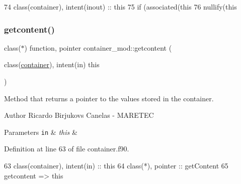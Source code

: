 \begin{DoxyCode}
74     \textcolor{keywordtype}{class}(container), \textcolor{keywordtype}{intent(inout)} :: this    
75     \textcolor{keywordflow}{if} (\textcolor{keyword}{associated}(this%
76     \textcolor{keyword}{nullify}(this%
\end{DoxyCode}
\mbox{\label{namespacecontainer__mod_a23a016e747d896622127c0c21dca9836}} 
\subsubsection{\texorpdfstring{getcontent()}{getcontent()}}
{\footnotesize\ttfamily class($\ast$) function, pointer container\+\_\+mod\+::getcontent (\begin{DoxyParamCaption}\item[{class(\mbox{\hyperlink{structcontainer__mod_1_1container}{container}}), intent(in)}]{this }\end{DoxyParamCaption})\hspace{0.3cm}{\ttfamily [private]}}



Method that returns a pointer to the values stored in the container. 

\begin{DoxyAuthor}{Author}
Ricardo Birjukovs Canelas -\/ M\+A\+R\+E\+T\+EC 
\end{DoxyAuthor}

\begin{DoxyParams}[1]{Parameters}
\mbox{\tt in}  & {\em this} & \\
\hline
\end{DoxyParams}


Definition at line 63 of file container.\+f90.


\begin{DoxyCode}
63     \textcolor{keywordtype}{class}(container), \textcolor{keywordtype}{intent(in)} :: this
64     \textcolor{keywordtype}{class}(*), \textcolor{keywordtype}{pointer} :: getContent
65     getcontent => this%
\end{DoxyCode}
\mbox{\label{namespacecontainer__mod_abf1785185971a527e437d3a489462724}} 
